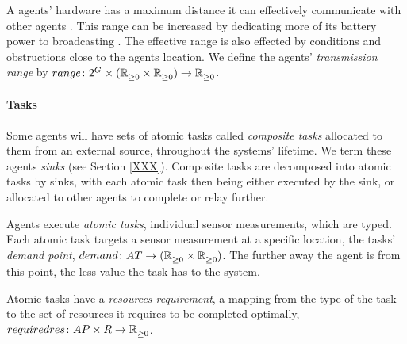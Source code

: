 A agents' hardware has a maximum distance it can effectively communicate with other agents \cite{Radman201}. This range can be increased by dedicating more of its battery power to broadcasting \cite{Padmanabh2008, Song2009}. The effective range is also effected by conditions and obstructions close to the agents location. We define the agents' \textit{transmission range} by $\formalTransmissionRange{}{}$.  


\newcommand{\formalTaskDemandPoint}[2]{
	\functionFormal{demand}
	{\setAtomicTask  {}{}}{\tupleLocation{}{}}
}
\newcommand{\functionTaskDemandPoint}[2]{\functionSignature{demand}{\varAtomicTask{}{}}}
\paragraph{Tasks}
\label{section:task_and_resources:tasks}
Some agents will have sets of atomic tasks called \textit{composite tasks} allocated to them from an external source, throughout the systems' lifetime. We term these agents \textit{sinks} (see Section \ref{XXX}). Composite tasks are decomposed into atomic tasks by sinks, with each atomic task then being either executed by the sink, or allocated to other agents to complete or relay further.

Agents execute \textit{atomic tasks}, individual sensor measurements, which are typed. Each atomic task targets a sensor measurement at a specific location, the tasks' \textit{demand point}, $\formalTaskDemandPoint{}{}$. The further away the agent is from this point, the less value the task has to the system.

\newcommand{\functionRequiredResourcesSymbol}[2]{
	\functionSymbol{requiredres}
}
\newcommand{\formalRequiredResources}[2]{
	\functionFormal{\functionRequiredResourcesSymbol{}{}}
	{\setAtomicTaskType{}{} \times \setResource{}{}}
	{\setRealNumbersNonNegative{}{}}
}
\newcommand{\functionRequiredResources}[2]{
	\functionSignature{\functionRequiredResourcesSymbol{}{}}{\varAtomicTaskType{}{}, \varResource{}{}}
}
\newcommand{\functionRequiredResourcesInstance}[2]{
	\functionSignature{\functionRequiredResourcesSymbol{}{}}
	{\functionAtomicTaskMapping{\varAtomicTask{}{}}{}, \functionResourceType{}{}}
}
Atomic tasks have a \textit{resources requirement}, a mapping from the type of the task to the set of resources it requires to be completed optimally, $\formalRequiredResources{}{}$. 

